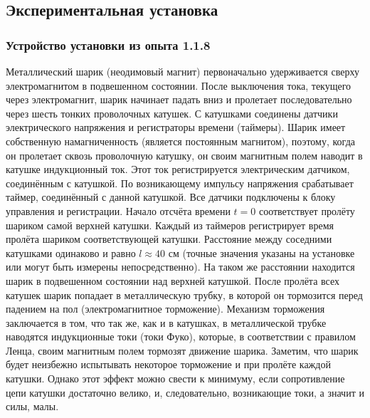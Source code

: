 \documentclass[a4paper, 12pt]{article}
\begin{document}
\begin{center}
    
\subsection*{Экспериментальная установка}
\bigskip
\subsubsection*{Устройство установки из опыта 1.1.8}
\bigskip
Металлический шарик (неодимовый магнит) первоначально удерживается сверху электромагнитом в подвешенном состоянии. После выключения тока, текущего через 
электромагнит, шарик начинает падать вниз и пролетает последовательно через 
шесть тонких проволочных катушек. С катушками соединены датчики электрического напряжения и регистраторы времени (таймеры). Шарик имеет собственную намагниченность (является постоянным магнитом), поэтому, когда он пролетает сквозь проволочную катушку, он своим магнитным полем наводит в катушке индукционный ток. Этот ток регистрируется 
электрическим датчиком, соединённым с катушкой. По возникающему импульсу напряжения срабатывает таймер, соединённый с данной катушкой. 
Все датчики подключены к блоку управления и 
регистрации. Начало отсчёта времени $t = 0$ соответствует пролёту шариком самой верхней катушки. Каждый из таймеров регистрирует время 
пролёта шариком соответствующей катушки. Расстояние между соседними катушками одинаково и 
равно $l \approx 40$ см (точные значения указаны на установке или могут быть измерены непосредственно). 
На таком же расстоянии находится шарик в подвешенном состоянии над верхней катушкой. 
После пролёта всех катушек шарик попадает в металлическую трубку, в которой он тормозится перед падением на пол (электромагнитное торможение). Механизм торможения заключается в том, 
что так же, как и в катушках, в металлической трубке наводятся индукционные токи (токи Фуко), которые, в соответствии с правилом Ленца, своим магнитным полем тормозят движение шарика. Заметим, что шарик будет неизбежно испытывать некоторое торможение и при пролёте каждой катушки. Однако этот эффект можно свести к минимуму, если сопротивление цепи катушки достаточно велико, и, следовательно, возникающие токи, а значит и силы, малы.


\end{center}
\end{document}
